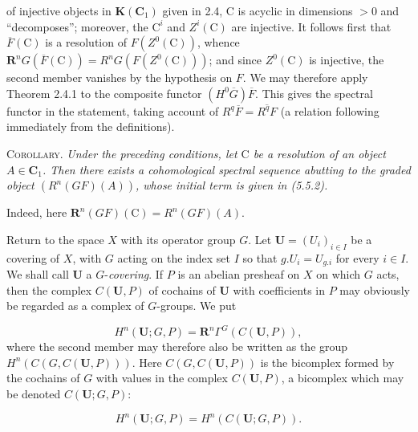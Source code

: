 \clearpage
{}

\noindent of injective objects in $\mathbf K({\mathbf C}_1)$ given in 2.4, $\mathrm C$ is
acyclic in dimensions $>0$ and ``decomposes''; moreover, the $\mathrm C^i$ and
$Z^i(\mathrm C)$ are injective. It follows first that $\overline F(\mathrm C)$ is a resolution
of $F(Z^0(\mathrm C))$, whence
${\mathbf R}^nG(\overline F(\mathrm C))=R^nG(F(Z^0(\mathrm C)))$; and since $Z^0(\mathrm C)$ is injective, the
second member vanishes by the hypothesis on $F$. We may therefore apply
Theorem 2.4.1 to the composite functor $(H^0\overline G)\overline F$. This gives
the spectral functor in the statement, taking account of
$R^q\overline F=\overline{R^qF}$ (a relation following immediately from the
definitions).

\textsc{Corollary.} \textit{Under the preceding conditions, let $\mathrm C$
be a resolution of an object $A\in {\mathbf C}_1$. Then there exists a cohomological
spectral sequence abutting to the graded object $(R^n(GF)(A))$, whose initial
term is given in \textup{(5.5.2)}.}

Indeed, here ${\mathbf R}^n(GF)(\mathrm C)=R^n(GF)(A)$.

Return to the space $X$ with its operator group $G$. Let
${\mathbf U}=(U_i)_{i\in I}$ be a covering of $X$, with $G$ acting on the index
set $I$ so that $g. U_i=U_{g. i}$ for every $i\in I$. We shall call
${\mathbf U}$ a $G$-\textit{covering}. If $P$ is an abelian presheaf on $X$ on which $G$
acts, then the complex $C({\mathbf U},P)$ of cochains of ${\mathbf U}$ with
coefficients in $P$ may obviously be regarded as a complex of $G$-groups. We
put

\[
\tag{5.5.3}
H^n({\mathbf U};G,P)={\mathbf R}^n\Gamma^G(C({\mathbf U},P)),
\]
where the second member may therefore also be written as the group
$H^n(C(G,C({\mathbf U},P)))$. Here $C(G,C({\mathbf U},P))$ is the bicomplex
formed by the cochains of $G$ with values in the complex $C({\mathbf U},P)$, a
bicomplex which may be denoted $C({\mathbf U};G,P)$:

\[
\tag{5.5.3 bis}
H^n({\mathbf U};G,P)=H^n(C({\mathbf U};G,P)).
\]

